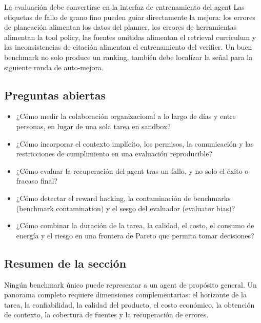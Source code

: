 \documentclass[a4paper]{article}
\begin{document}

\begin{importantbox}{La evaluación debe convertirse en la interfaz de entrenamiento del agent}
Las etiquetas de fallo de grano fino pueden guiar directamente la mejora: los errores de planeación alimentan los datos del planner, los errores de herramientas alimentan la tool policy, las fuentes omitidas alimentan el retrieval curriculum y las inconsistencias de citación alimentan el entrenamiento del verifier. Un buen benchmark no solo produce un ranking, también debe localizar la señal para la siguiente ronda de auto-mejora.
\end{importantbox}

\subsection{Preguntas abiertas}

\begin{itemize}
    \item ¿Cómo medir la colaboración organizacional a lo largo de días y entre personas, en lugar de una sola tarea en sandbox?
    \item ¿Cómo incorporar el contexto implícito, los permisos, la comunicación y las restricciones de cumplimiento en una evaluación reproducible?
    \item ¿Cómo evaluar la recuperación del agent tras un fallo, y no solo el éxito o fracaso final?
    \item ¿Cómo detectar el reward hacking, la contaminación de benchmarks (benchmark contamination) y el sesgo del evaluador (evaluator bias)?
    \item ¿Cómo combinar la duración de la tarea, la calidad, el costo, el consumo de energía y el riesgo en una frontera de Pareto que permita tomar decisiones?
\end{itemize}

\subsection{Resumen de la sección}

Ningún benchmark único puede representar a un agent de propósito general. Un panorama completo requiere dimensiones complementarias: el horizonte de la tarea, la confiabilidad, la calidad del producto, el costo económico, la obtención de contexto, la cobertura de fuentes y la recuperación de errores.
\end{document}
